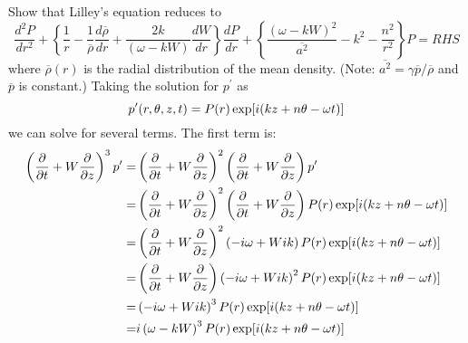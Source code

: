 \documentclass[onecolumn,10pt]{jhwhw}
\begin{document}
Show that Lilley’s equation reduces to
$$
\dfrac{d^2 P}{dr^2} + \left \{ \dfrac{1}{r} - \dfrac{1}{\overline{\rho}} \dfrac{d \overline{\rho}}{dr} + \dfrac{2k}{(\omega-kW)}  \dfrac{dW}{dr} \right \} \dfrac{dP}{dr} + \left \{ \dfrac{(\omega-kW)^2}{\overline{a^2}} -k^2-\dfrac{n^2}{r^2} \right \} P = RHS
$$
where $\overline{\rho}(r)$ is the radial distribution of the mean density. (Note: $\overline{a^2} = \gamma \overline{p}/\overline{\rho}$ and $\overline{p}$ is constant.)
\solution
Taking the solution for $p^{\prime}$ as
$$
p^{\prime} (r,\theta,z,t) = P(r) \exp[i(kz+n \theta - \omega t)]
$$
we can solve for several terms. The first term is:
\begin{align*}
\left ( \dfrac{\partial}{\partial t} + W \dfrac{\partial}{\partial z} \right)^3 p^{\prime} =&
\left ( \dfrac{\partial}{\partial t} + W \dfrac{\partial}{\partial z} \right)^2 \left ( \dfrac{\partial}{\partial t} + W \dfrac{\partial}{\partial z} \right) p^{\prime} \\
=& \left ( \dfrac{\partial}{\partial t} + W \dfrac{\partial}{\partial z} \right)^2 \left ( \dfrac{\partial}{\partial t} + W \dfrac{\partial}{\partial z} \right) P(r) \exp[i(kz+n \theta - \omega t)] \\
=& \left ( \dfrac{\partial}{\partial t} + W \dfrac{\partial}{\partial z} \right)^2 \left ( -i \omega + W ik \right) P(r) \exp[i(kz+n \theta - \omega t)] \\
=& \left ( \dfrac{\partial}{\partial t} + W \dfrac{\partial}{\partial z} \right) \left ( -i \omega + W ik \right)^2 P(r) \exp[i(kz+n \theta - \omega t)] \\
=& \left ( -i \omega + W ik \right)^3 P(r) \exp[i(kz+n \theta - \omega t)] \\
=& i \left ( \omega-k W \right)^3 P(r) \exp[i(kz+n \theta - \omega t)] \\
\end{align*}
\end{document}
